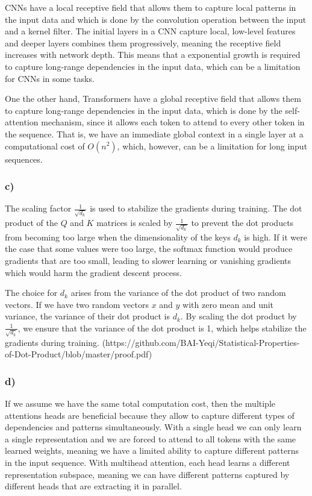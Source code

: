 \documentclass{article}
\begin{document}
CNNs have a local receptive field that allows them to capture local patterns in the input data and which is done
by the convolution operation between the input and a kernel filter. The initial layers in a CNN capture local, low-level
features and deeper layers combines them progressively, meaning the receptive field increases with network depth. This means
that a exponential growth is required to capture long-range dependencies in the input data, which can be a limitation
for CNNs in some tasks.

One the other hand, Transformers have a global
receptive field that allows them to capture long-range dependencies in the input data, which is done by the self-attention
mechanism, since it allows each token to attend to every other token in the sequence. That is, we have an immediate
global context in a single layer at a computational cost of $O(n^2)$, which, however, can be a limitation for long input sequences.

\subsubsection*{c)}

The scaling factor $\frac{1}{\sqrt{d_k}}$ is used to stabilize the gradients during training. The dot product of the
$Q$ and $K$ matrices is scaled by $\frac{1}{\sqrt{d_k}}$ to prevent the dot products from becoming too large when the
dimensionality of the keys $d_k$ is high. If it were the case that some values were too large, the softmax function would
produce gradients that are too small, leading to slower learning or vanishing gradients which would harm the gradient descent process.

The choice for $d_k$ arises from the variance of the dot product of two random vectors. If we have two random vectors $x$ and $y$
with zero mean and unit variance, the variance of their dot product is $d_k$. By scaling the dot product by $\frac{1}{\sqrt{d_k}}$,
we ensure that the variance of the dot product is 1, which helps stabilize the gradients during training.
(https://github.com/BAI-Yeqi/Statistical-Properties-of-Dot-Product/blob/master/proof.pdf)

\subsubsection*{d)}

If we assume we have the same total computation cost, then the multiple attentions heads are beneficial because they allow
to capture different types of dependencies and patterns simultaneously.
With a single head we can only learn a single representation and we are forced to attend to all tokens with the same
learned weights, meaning we have a limited ability to capture different patterns in the input sequence.
With multihead attention, each head learns a different representation subspace, meaning we can have different patterns
captured by different heads that are extracting it in parallel. 
\end{document}
